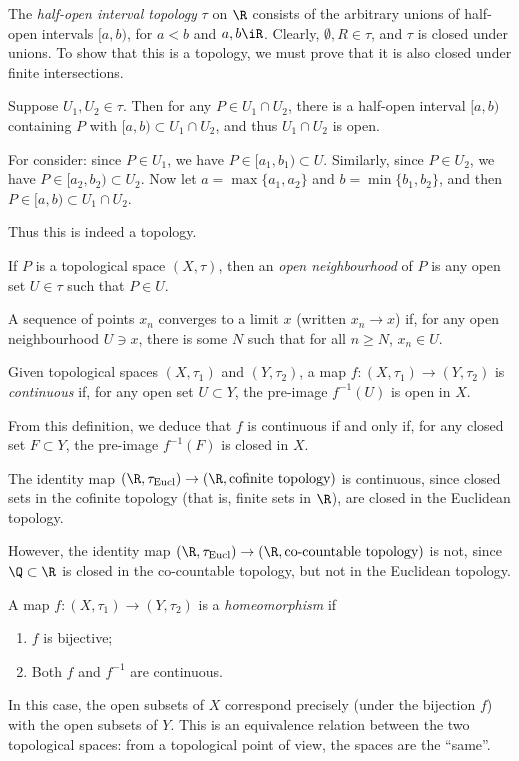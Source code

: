 \begin{example}
	The \emph{half-open interval topology} $\tau$ on $\R$ consists of the arbitrary unions of half-open intervals $[a,b)$, for $a<b$ and $a,b\iR$. Clearly, $\emptyset, R \in \tau$, and $\tau$ is closed under unions. To show that this is a topology, we must prove that it is also closed under finite intersections.

	Suppose $U_1,U_2 \in \tau$. Then for any $P\in U_1 \cap U_2$, there is a half-open interval $[a,b)$ containing $P$ with $[a,b) \subset U_1 \cap U_2$, and thus $U_1 \cap U_2$ is open.

	For consider: since $P\in U_1$, we have $P\in [a_1,b_1) \subset U$. Similarly, since $P\in U_2$, we have $P\in [a_2,b_2) \subset U_2$. Now let $a=\max\{a_1,a_2\}$ and $b=\min\{b_1,b_2\}$, and then $P\in [a,b) \subset U_1 \cap U_2$.

	Thus this is indeed a topology.
\end{example}

\begin{definition}
	If $P$ is a topological space $(X,\tau)$, then an \emph{open neighbourhood} of $P$ is any open set $U \in \tau$ such that $P \in U$.

	A sequence of points $x_n$ converges to a limit $x$ (written $x_n \to x$) if, for any open neighbourhood $U\ni x$, there is some $N$ such that for all $n\geq N$, $x_n \in U$.

	Given topological spaces $(X,\tau_1)$ and $(Y,\tau_2)$, a map $f:(X,\tau_1) \to (Y,\tau_2)$ is \emph{continuous} if, for any open set $U \subset Y$, the pre-image $f^{-1}(U)$ is open in $X$.

	From this definition, we deduce that $f$ is continuous if and only if, for any closed set $F\subset Y$, the pre-image $f^{-1}(F)$ is closed in $X$.
\end{definition}

\begin{examples}
	The identity map $(\R,\tau_\Eucl) \to (\R,\text{cofinite topology})$ is continuous, since closed sets in the cofinite topology (that is, finite sets in $\R$), are closed in the Euclidean topology.

	However, the identity map $(\R,\tau_\Eucl) \to (\R,\text{co-countable topology})$ is not, since $\Q\subset\R$ is closed in the co-countable topology, but not in the Euclidean topology.
\end{examples}

\begin{definition}
	A map $f:(X,\tau_1)\to(Y,\tau_2)$ is a \emph{homeomorphism} if
	\begin{enumerate}
		\shortskip
		\item $f$ is bijective;
		\item Both $f$ and $f^{-1}$ are continuous.
	\end{enumerate}
	In this case, the open subsets of $X$ correspond precisely (under the bijection $f$) with the open subsets of $Y$. This is an equivalence relation between the two topological spaces: from a topological point of view, the spaces are the ``same''.
\end{definition}

